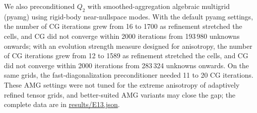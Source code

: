 We also preconditioned $Q_2$ with smoothed-aggregation algebraic multigrid (pyamg) using rigid-body near-nullspace modes. With the default pyamg settings, the number of CG iterations grew from 16 to 1700 as refinement stretched the cells, and CG did not converge within 2000 iterations from 193\,980 unknowns onwards; with an evolution strength measure designed for anisotropy, the number of CG iterations grew from 12 to 1589 as refinement stretched the cells, and CG did not converge within 2000 iterations from 283\,324 unknowns onwards. On the same grids, the fast-diagonalization preconditioner needed 11 to 20 CG iterations. These AMG settings were not tuned for the extreme anisotropy of adaptively refined tensor grids, and better-suited AMG variants may close the gap; the complete data are in \url{results/E13.json}.
